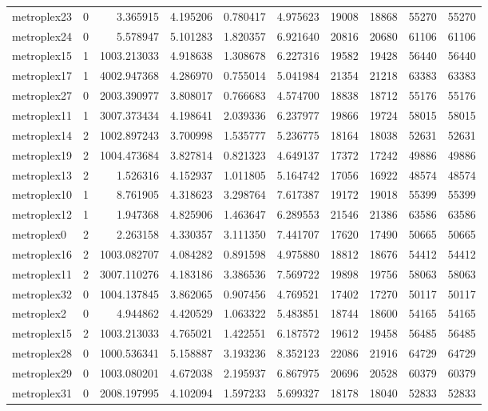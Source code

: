 \begin{longtable}{|l|r|r|r|r|r|r|r|r|r|}
metroplex23 & 0 & 3.365915 & 4.195206 & 0.780417 & 4.975623 & 19008 & 18868 & 55270 & 55270 \\
metroplex24 & 0 & 5.578947 & 5.101283 & 1.820357 & 6.921640 & 20816 & 20680 & 61106 & 61106 \\
metroplex15 & 1 & 1003.213033 & 4.918638 & 1.308678 & 6.227316 & 19582 & 19428 & 56440 & 56440 \\
metroplex17 & 1 & 4002.947368 & 4.286970 & 0.755014 & 5.041984 & 21354 & 21218 & 63383 & 63383 \\
metroplex27 & 0 & 2003.390977 & 3.808017 & 0.766683 & 4.574700 & 18838 & 18712 & 55176 & 55176 \\
metroplex11 & 1 & 3007.373434 & 4.198641 & 2.039336 & 6.237977 & 19866 & 19724 & 58015 & 58015 \\
metroplex14 & 2 & 1002.897243 & 3.700998 & 1.535777 & 5.236775 & 18164 & 18038 & 52631 & 52631 \\
metroplex19 & 2 & 1004.473684 & 3.827814 & 0.821323 & 4.649137 & 17372 & 17242 & 49886 & 49886 \\
metroplex13 & 2 & 1.526316 & 4.152937 & 1.011805 & 5.164742 & 17056 & 16922 & 48574 & 48574 \\
metroplex10 & 1 & 8.761905 & 4.318623 & 3.298764 & 7.617387 & 19172 & 19018 & 55399 & 55399 \\
metroplex12 & 1 & 1.947368 & 4.825906 & 1.463647 & 6.289553 & 21546 & 21386 & 63586 & 63586 \\
metroplex0 & 2 & 2.263158 & 4.330357 & 3.111350 & 7.441707 & 17620 & 17490 & 50665 & 50665 \\
metroplex16 & 2 & 1003.082707 & 4.084282 & 0.891598 & 4.975880 & 18812 & 18676 & 54412 & 54412 \\
metroplex11 & 2 & 3007.110276 & 4.183186 & 3.386536 & 7.569722 & 19898 & 19756 & 58063 & 58063 \\
metroplex32 & 0 & 1004.137845 & 3.862065 & 0.907456 & 4.769521 & 17402 & 17270 & 50117 & 50117 \\
metroplex2 & 0 & 4.944862 & 4.420529 & 1.063322 & 5.483851 & 18744 & 18600 & 54165 & 54165 \\
metroplex15 & 2 & 1003.213033 & 4.765021 & 1.422551 & 6.187572 & 19612 & 19458 & 56485 & 56485 \\
metroplex28 & 0 & 1000.536341 & 5.158887 & 3.193236 & 8.352123 & 22086 & 21916 & 64729 & 64729 \\
metroplex29 & 0 & 1003.080201 & 4.672038 & 2.195937 & 6.867975 & 20696 & 20528 & 60379 & 60379 \\
metroplex31 & 0 & 2008.197995 & 4.102094 & 1.597233 & 5.699327 & 18178 & 18040 & 52833 & 52833 \\

\end{longtable}

